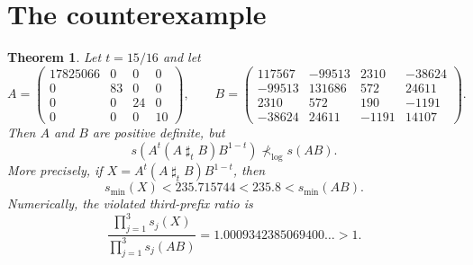 \documentclass[11pt]{article}
\newtheorem{theorem}{Theorem}
\newcommand{\smin}{s_{\min}}
\newcommand{\sharpw}{\mathbin{\sharp}}
\begin{document}
\section{The counterexample}

\begin{theorem}\label{thm:counterexample}
Let $t=15/16$ and let
\[
A=\begin{pmatrix}
17825066&0&0&0\\
0&83&0&0\\
0&0&24&0\\
0&0&0&10
\end{pmatrix},
\qquad
B=\begin{pmatrix}
117567&-99513&2310&-38624\\
-99513&131686&572&24611\\
2310&572&190&-1191\\
-38624&24611&-1191&14107
\end{pmatrix}.
\]
Then $A$ and $B$ are positive definite, but
\[
s\!\left(A^t(A\sharpw_tB)B^{1-t}\right)
\not\prec_{\log}s(AB).
\]
More precisely, if $X=A^t(A\sharpw_tB)B^{1-t}$, then
\begin{equation}\label{eq:gap}
 \smin(X)<235.715744<235.8<\smin(AB).
\end{equation}
Numerically, the violated third-prefix ratio is
\[
 \frac{\prod_{j=1}^3s_j(X)}{\prod_{j=1}^3s_j(AB)}
 =1.0009342385069400\ldots>1.
\]
\end{theorem}
\end{document}
